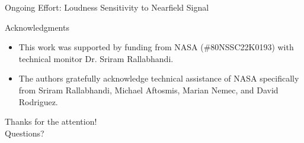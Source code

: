 \documentclass{beamer}
\begin{document}
{\begin{frame}[t]{Ongoing Effort: Loudness Sensitivity to Nearfield Signal}

\end{frame}


\begin{frame}[t]{Acknowledgments}

  \begin{itemize}
    \item This work was supported by funding from NASA (\#80NSSC22K0193) with technical monitor Dr. Sriram Rallabhandi.
    \item The authors gratefully acknowledge technical assistance of NASA specifically from Sriram Rallabhandi, Michael Aftosmis, Marian Nemec, and David Rodriguez.
  \end{itemize}

\end{frame}

}



\begin{frame}[plain]
  \vfill
  \centering
  {Thanks for the attention! \\ \small Questions?}
  \vfill
\end{frame}
\end{document}
